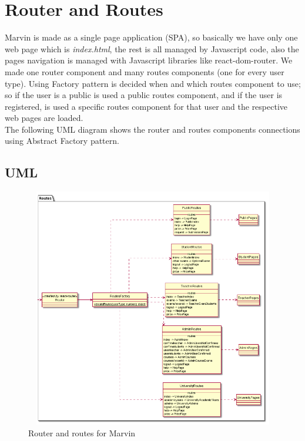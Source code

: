 \documentclass[../react.tex]{subfiles}
\begin{document}
	
	\section{Router and Routes} Marvin is made as a single page application (SPA), so basically we have only one web page which is \textit{index.html}, the rest is all managed by Javascript code, also the pages navigation is managed with Javascript libraries like react-dom-router. We made one router component and many routes components (one for every user type). Using Factory pattern is decided when and which routes component to use; so if the user is a public is used a public routes component, and if the user is registered, is used a specific routes component for that user and the respective web pages are loaded. \\
	The following UML diagram shows the router and routes components connections using Abstract Factory pattern.
		\subsection{UML}
			\begin{figure}[h]
			\centering
			\includegraphics[width=13cm,height=10.5cm]{"diagrammi/react/routes"}
			\caption{Router and routes for Marvin}
			\label{fig:Router and routes for Marvin}
		\end{figure}
		\newpage
	
\end{document}
